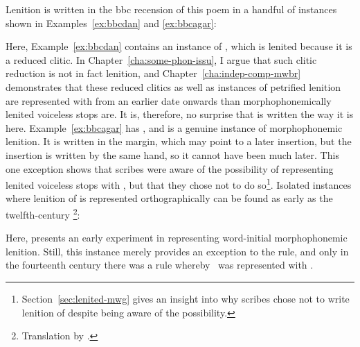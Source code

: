 Lenition is written in the \gls{bbc} recension of this poem in a handful of instances shown in Examples~\ref{ex:bbcdan} and \ref{ex:bbcagar}:
\begin{mwl}
\end{mwl}
Here, Example~\ref{ex:bbcdan} contains an instance of , which is lenited because it is a reduced clitic. In Chapter~\ref{cha:some-phon-issu}, I argue that such clitic reduction is not in fact lenition, and Chapter~\ref{cha:indep-comp-mwbr} demonstrates that these reduced clitics as well as instances of petrified lenition are represented with  from an earlier date onwards than morphophonemically lenited voiceless stops are. It is, therefore, no surprise that  is written the way it is here. Example~\ref{ex:bbcagar} has , and is a genuine instance of morphophonemic lenition. It is written in the margin, which may point to a later insertion, but the insertion is written by the same hand, so it cannot have been much later. This one exception shows that scribes were aware of the possibility of representing lenited voiceless stops with , but that they chose not to do so\footnote{Section~\ref{sec:lenited-mwg} gives an insight into why scribes chose not to write lenition of  despite being aware of the possibility.}. Isolated instances where lenition of  is represented orthographically can be found as early as the twelfth-century \footnote{Translation by \textcite[136]{davies_braint_1974}.}:
\begin{mwl}
\end{mwl}
Here,   presents an early experiment in representing word-initial morphophonemic lenition. Still, this instance merely  provides an exception to the rule, and only in the fourteenth century there was a rule whereby \lT\ was represented with .


